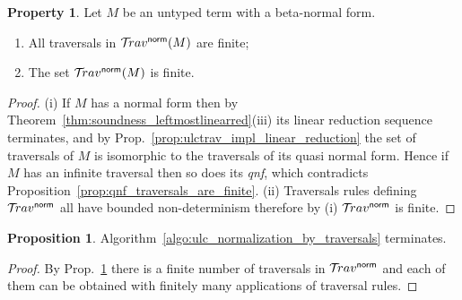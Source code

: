 \documentclass{article}
\theoremstyle{definition}
\newtheorem{property}{Property}[section]
\newtheorem{proposition}{Proposition}[section]
\newcommand{\normalizing}{{\sf norm}}
\newcommand{\travsetnorm}{\travset^\normalizing}
\begin{document}
\begin{property}
\label{prop:ulc_travnorm_finite}
Let $M$ be an untyped term with a beta-normal form.
\begin{enumerate}[label=(\roman*)]
\item All traversals in $\travsetnorm(M)$ are finite;
\item The set $\travsetnorm(M)$ is finite.
\end{enumerate}
\end{property}
\begin{proof}
(i) If $M$ has a normal form then by Theorem~\ref{thm:soundness_leftmostlinearred}(iii) its linear reduction sequence terminates, and by Prop.~\ref{prop:ulctrav_impl_linear_reduction} the set of traversals of $M$ is isomorphic to the traversals of its quasi normal form. Hence if $M$ has an infinite traversal then so does its \emph{qnf}, which contradicts Proposition~\ref{prop:qnf_traversals_are_finite}.
(ii) Traversals rules defining $\travsetnorm$ all have bounded non-determinism therefore by (i) $\travsetnorm$ is finite.
\end{proof}

\begin{proposition}
Algorithm~\ref{algo:ulc_normalization_by_traversals} terminates.
\end{proposition}
\begin{proof}
By Prop.~\ref{prop:ulc_travnorm_finite} there is a finite number of traversals in $\travsetnorm$ and each of them can be obtained with finitely many applications of traversal rules.
\end{proof}
\end{document}
